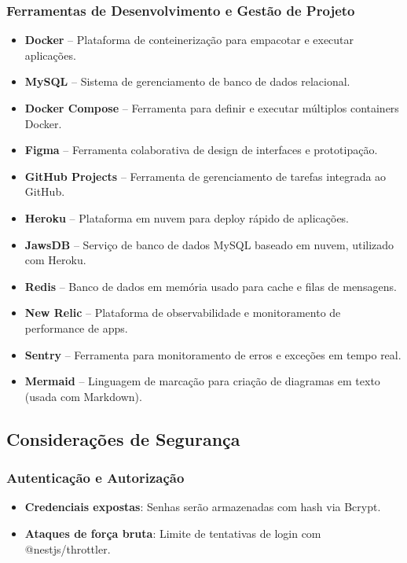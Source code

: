 \documentclass[12pt, a4paper]{article}
\begin{document}
\begin{spacing}{1.5}
\subsubsection{Ferramentas de Desenvolvimento e Gestão de Projeto}
\begin{itemize}
\item \textbf{Docker} – Plataforma de conteinerização para empacotar e executar aplicações.
\item \textbf{MySQL} – Sistema de gerenciamento de banco de dados relacional.
\item \textbf{Docker Compose} – Ferramenta para definir e executar múltiplos containers Docker.
\item \textbf{Figma} – Ferramenta colaborativa de design de interfaces e prototipação.
\item \textbf{GitHub Projects} – Ferramenta de gerenciamento de tarefas integrada ao GitHub.
\item \textbf{Heroku} – Plataforma em nuvem para deploy rápido de aplicações.
\item \textbf{JawsDB} – Serviço de banco de dados MySQL baseado em nuvem, utilizado com Heroku.
\item \textbf{Redis} – Banco de dados em memória usado para cache e filas de mensagens.
\item \textbf{New Relic} – Plataforma de observabilidade e monitoramento de performance de apps.
\item \textbf{Sentry} – Ferramenta para monitoramento de erros e exceções em tempo real.
\item \textbf{Mermaid} – Linguagem de marcação para criação de diagramas em texto (usada com Markdown).
\end{itemize}

\subsection{Considerações de Segurança}
\subsubsection{Autenticação e Autorização}
\begin{spacing}{1.5}
\begin{itemize}
    \item \textbf{Credenciais expostas}: Senhas serão armazenadas com hash via Bcrypt.
    \item \textbf{Ataques de força bruta}: Limite de tentativas de login com @nestjs/throttler.
\end{itemize}
\end{spacing}


\end{spacing}
\end{document}

